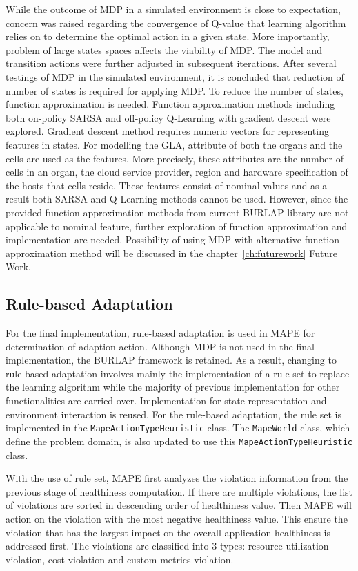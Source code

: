 \documentclass{seal_thesis}
\begin{document}
While the outcome of MDP in a simulated environment is close to expectation, concern was raised regarding the convergence of Q-value that learning algorithm relies on to determine the optimal action in a given state.
More importantly, problem of large states spaces affects the viability of MDP.
The model and transition actions were further adjusted in subsequent iterations.
After several testings of MDP in the simulated environment, it is concluded that reduction of number of states is required for applying MDP.
To reduce the number of states, function approximation is needed.
Function approximation methods including both on-policy SARSA and off-policy Q-Learning with gradient descent were explored.
Gradient descent method requires numeric vectors for representing features in states.
For modelling the GLA, attribute of both the organs and the cells are used as the features.
More precisely, these attributes are the number of cells in an organ, the cloud service provider, region and hardware specification of the hosts that cells reside.
These features consist of nominal values and as a result both SARSA and Q-Learning methods cannot be used.
However, since the provided function approximation methods from current BURLAP library are not applicable to nominal feature, further exploration of function approximation and implementation are needed.
Possibility of using MDP with alternative function approximation method will be discussed in the chapter~\ref{ch:futurework} Future Work.

\subsection{Rule-based Adaptation} \label{RBAdaptationLogic}
For the final implementation, rule-based adaptation is used in MAPE for determination of adaption action. 
Although MDP is not used in the final implementation, the BURLAP framework is retained.
As a result, changing to rule-based adaptation involves mainly the implementation of a rule set to replace the learning algorithm while the majority of previous implementation for other functionalities are carried over.
Implementation for state representation and environment interaction is reused.
For the rule-based adaptation, the rule set is implemented in the \texttt{MapeActionTypeHeuristic} class.
The \texttt{MapeWorld} class, which define the problem domain, is also updated to use this \texttt{MapeActionTypeHeuristic} class.

With the use of rule set, MAPE first analyzes the violation information from the previous stage of healthiness computation.
If there are multiple violations, the list of violations are sorted in descending order of healthiness value.
Then MAPE will action on the violation with the most negative healthiness value.
This ensure the violation that has the largest impact on the overall application healthiness is addressed first.
The violations are classified into 3 types: resource utilization violation, cost violation and custom metrics violation.
\end{document}
